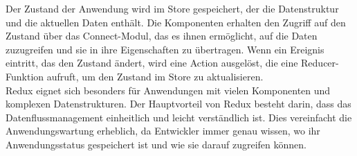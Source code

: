 Der Zustand der Anwendung wird im Store gespeichert, der die Datenstruktur und die aktuellen Daten enthält. Die Komponenten erhalten den Zugriff auf den Zustand über das Connect-Modul, das es ihnen ermöglicht, auf die Daten zuzugreifen und sie in ihre Eigenschaften zu übertragen. Wenn ein Ereignis eintritt, das den Zustand ändert, wird eine Action ausgelöst, die eine Reducer-Funktion aufruft, um den Zustand im Store zu aktualisieren.\\
Redux eignet sich besonders für Anwendungen mit vielen Komponenten und komplexen Datenstrukturen. Der Hauptvorteil von Redux besteht darin, dass das Datenflussmanagement einheitlich und leicht verständlich ist. Dies vereinfacht die Anwendungswartung erheblich, da Entwickler immer genau wissen, wo ihr Anwendungsstatus gespeichert ist und wie sie darauf zugreifen können.\\

